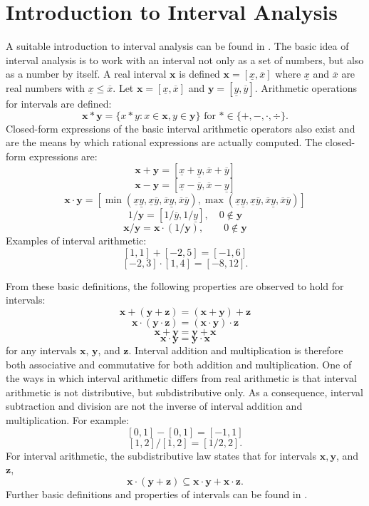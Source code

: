 \section{Introduction to Interval Analysis}

A suitable introduction to interval analysis can be found in \cite{Moore79}.
The basic idea of interval analysis is to work with an interval not only as a
set of numbers, but also as a number by itself.  
A real interval $\mathbf{x}$ is defined 
$\mathbf{x} = [\underline{x},\overline{x}]$
where $\underline{x}$ and $\overline{x}$ are real numbers
with  $\underline{x} \leq \overline{x}$.
Let $\mathbf{x} = [\underline{x}, \overline{x}]$ and 
$\mathbf{y} = [\underline{y}, \overline{y}]$.
Arithmetic operations for intervals are defined:
$$
\mathbf{x} * \mathbf{y} = \{x * y : x \in \mathbf{x}, y \in \mathbf{y} \} 
\mbox{ for } * \in \{ +,-,\cdot,\div\}.
$$
Closed-form expressions of the basic interval arithmetic operators also exist
and are the means by which rational expressions are actually computed.  The
closed-form expressions are:
$$
\mathbf{x} + \mathbf{y} = [\underline{x} + \underline{y}, 
 \overline{x}+ \overline{y}]
$$
$$
\mathbf{x}  - \mathbf{y} = [\underline{x}-\overline{y},
\overline{x}-\underline{y}]
$$
$$
\mathbf{x}  \cdot \mathbf{y} = [\min(\underline{x}\underline{y},
    \underline{x}\overline{y}, \overline{x}\underline{y},
    \overline{x}\overline{y}),
  \max(\underline{x}\underline{y}, \underline{x}\overline{y}, 
       \overline{x}\underline{y}, \overline{x}\overline{y})]
$$
$$ 1 / \mathbf{y} = [1/\overline{y}, 1/\underline{y}], \quad 0 \notin
\mathbf{y}
$$
$$\mathbf{x}  / \mathbf{y} = \mathbf{x} \cdot (1/\mathbf{y}), \qquad 0 \notin
\mathbf{y}
$$
Examples of interval arithmetic:
$$[1,1] + [-2,5] = [-1,6]$$
$$[-2,3] \cdot [1,4] = [-8,12].$$

From these basic definitions, the following properties are observed to hold for
intervals:
$$
\mathbf{x} + (\mathbf{y} + \mathbf{z}) = (\mathbf{x} + \mathbf{y}) +
\mathbf{z}
$$
$$
\mathbf{x} \cdot (\mathbf{y} \cdot \mathbf{z}) = (\mathbf{x} \cdot \mathbf{y})
\cdot \mathbf{z}
$$
$$
\mathbf{x} + \mathbf{y} = \mathbf{y} + \mathbf{x}
$$
$$
\mathbf{x} \cdot \mathbf{y} = \mathbf{y} \cdot \mathbf{x}
$$
for any intervals $\mathbf{x}$, $\mathbf{y}$, and $\mathbf{z}$.  Interval
addition and multiplication is therefore both associative and 
commutative for both addition and multiplication.
One of the ways in which interval arithmetic differs from real arithmetic is
that interval arithmetic is not distributive, but subdistributive only.  
As a consequence, interval
subtraction and division are not the inverse of interval 
addition and multiplication.  For example:
$$[0,1]-[0,1] = [-1,1]$$
$$[1,2]/[1,2] = [1/2, 2].$$
For interval arithmetic, the subdistributive law states that for
intervals $\mathbf{x}, \mathbf{y}$, and $\mathbf{z}$,
$$\mathbf{x}\cdot (\mathbf{y}+\mathbf{z}) \subseteq 
  \mathbf{x}\cdot \mathbf{y}+\mathbf{x}\cdot\mathbf{z}.$$
Further basic definitions and properties of intervals
can be found in \cite{RR84}.
